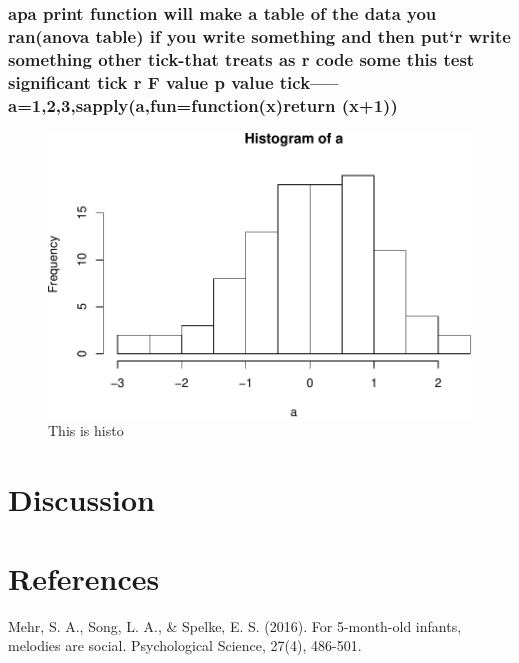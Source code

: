 \documentclass[man]{apa6}
\begin{document}
\subsubsection{apa print function will make a table of the data you
ran(anova table) if you write something and then put`r write something
other tick-that treats as r code some this test significant tick r F
value p value tick-----a=1,2,3,sapply(a,fun=function(x)return
(x+1))}\label{apa-print-function-will-make-a-table-of-the-data-you-rananova-table-if-you-write-something-and-then-putr-write-something-other-tick-that-treats-as-r-code-some-this-test-significant-tick-r-f-value-p-value-ticka123sapplyafunfunctionxreturn-x1}

\begin{figure}
\centering
\includegraphics{Papa_files/figure-latex/myfig-1.pdf}
\caption{\label{fig:myfig}This is histo}
\end{figure}

\section{Discussion}\label{discussion}

\newpage

\section{References}\label{references}

Mehr, S. A., Song, L. A., \& Spelke, E. S. (2016). For 5-month-old
infants, melodies are social. Psychological Science, 27(4), 486-501.

\begingroup
\setlength{\parindent}{-0.5in} \setlength{\leftskip}{0.5in}
\end{document}
